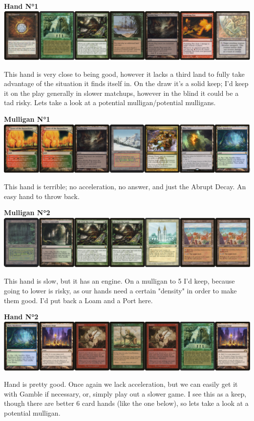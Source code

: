 \documentclass{report}
\begin{document}
\begin{center}
\textbf{Hand N°1}
\includegraphics [width =\textwidth] {jundhand1}
\end{center}
This hand is very close to being good, however it lacks a third land to fully take advantage of the situation it finds itself in. On the draw it's a solid keep; I'd keep it on the play generally in slower matchups, however in the blind it could be a tad risky. Lets take a look at a potential mulligan/potential mulligans.
\newpage
\begin{center}
\textbf{Mulligan N°1}
\includegraphics [width =\textwidth] {jundmull1}
\end{center}
This hand is terrible; no acceleration, no answer, and just the Abrupt Decay. An easy hand to throw back.
\begin{center}
\textbf{Mulligan N°2}
\includegraphics [width =\textwidth] {jundmull2}
\end{center}
This hand is slow, but it has an engine. On a mulligan to 5 I'd keep, because going to lower is risky, as our hands need a certain "density" in order to make them good. I'd put back a Loam and a Port here.
\begin{center}
\textbf{Hand N°2}
\includegraphics [width =\textwidth] {jundhand2}
\end{center}
Hand is pretty good. Once again we lack acceleration, but we can easily get it with Gamble if necessary, or, simply play out a slower game. I see this as a keep, though there are better 6 card hands (like the one below), so lets take a look at a potential mulligan.
\end{document}
